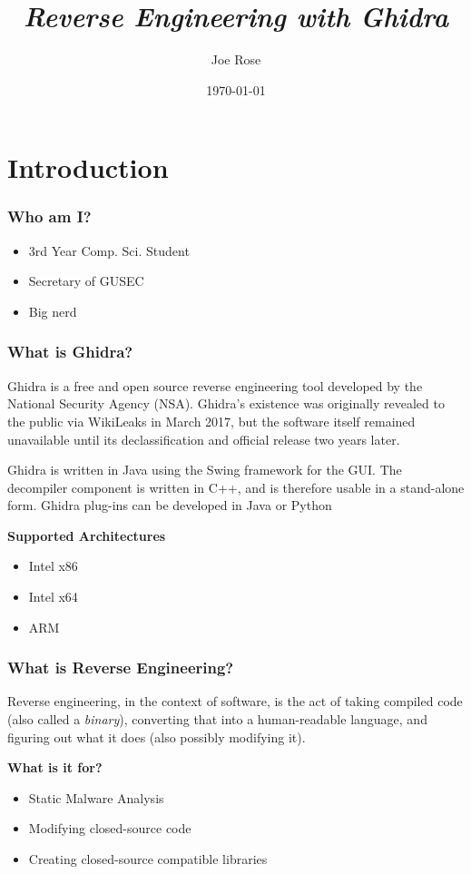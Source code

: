 \documentclass{beamer}
\title{\textit{Reverse Engineering with Ghidra}}
\author{Joe Rose}
\institute{GUSEC}
\date{\today}
\begin{document}
	
	\frame{\titlepage}
	
	\section{Introduction}
	\begin{frame}
		\frametitle{Who am I?}
		\begin{itemize}
			\item 3rd Year Comp. Sci. Student
			\item Secretary of GUSEC
			\item Big nerd
		\end{itemize}
	\end{frame}

	\begin{frame}
		\frametitle{What is Ghidra?}
		Ghidra is a free and open source reverse engineering tool developed by the National Security Agency (NSA). Ghidra's existence was originally revealed to the public via WikiLeaks in March 2017, but the software itself remained unavailable until its declassification and official release two years later. 
		\newline
		
		Ghidra is written in Java using the Swing framework for the GUI. The decompiler component is written in C++, and is therefore usable in a stand-alone form. Ghidra plug-ins can be developed in Java or Python
		\newline
		
		\textbf{Supported Architectures}
		\begin{itemize}
			\item Intel x86
			\item Intel x64
			\item ARM
		\end{itemize}
		
	\end{frame}

	\begin{frame}
		\frametitle{What is Reverse Engineering?}
		Reverse engineering, in the context of software, is the act of taking compiled code (also called a \textit{binary}), converting that into a human-readable language, and figuring out what it does (also possibly modifying it).
		\newline
		
		\textbf{What is it for?}
		\begin{itemize}
			\item Static Malware Analysis
			\item Modifying closed-source code
			\item Creating closed-source compatible libraries
		\end{itemize}
		
	\end{frame}
\end{document}
